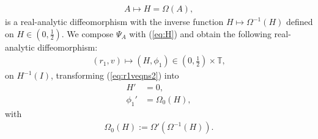 \documentclass[reqno,12pt]{amsart}
\newcommand{\eqlab}[1]{\label{eq:#1}}
\renewcommand{\eqref}[1]{(\ref{eq:#1})}
\numberwithin{equation}{section}
\begin{document}
\begin{align}
A\mapsto H=\Omega(A),\eqlab{H}
\end{align}
is a real-analytic diffeomorphism  with the inverse function $H\mapsto \Omega^{-1}(H)$ defined on $H\in \left(0,\frac12\right)$. We compose $\Psi_A$ with \eqref{H} and obtain the following real-analytic diffeomorphism:
\begin{align*}
 (r_1,v)\mapsto (H,\phi_1)\in \left(0,\frac12\right)\times \mathbb T,
\end{align*}
on $H^{-1}(I)$, transforming \eqref{r1veqns2} into
\begin{align*}
 H'&=0,\\
 \phi_1' &=\Omega_0(H),
\end{align*}
with
\begin{align}
 \Omega_0(H):=\Omega'(\Omega^{-1}(H)).\eqlab{Omega0H}
\end{align}
\end{document}
